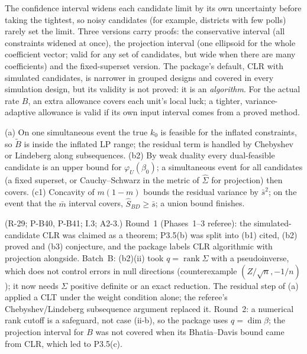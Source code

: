 \begin{plain}
The confidence interval widens each candidate limit by its own uncertainty before
taking the tightest, so noisy candidates (for example, districts with few polls)
rarely set the limit. Three versions carry proofs: the conservative interval (all
constraints widened at once), the projection interval (one ellipsoid for the
whole coefficient vector; valid for any set of candidates, but wide when there
are many coefficients) and the fixed-superset version. The package's default,
CLR with simulated candidates, is narrower in grouped designs and covered in every
simulation design, but its validity is not proved: it is an \emph{algorithm}.
For the actual rate $B$, an extra allowance covers each unit's local luck; a
tighter, variance-adaptive allowance is valid if its own input interval comes
from a proved method.
\end{plain}
\begin{sketch}
(a) On one simultaneous event the true $k_0$ is feasible for the inflated
constraints, so $\tilde B$ is inside the inflated LP range; the residual term is
handled by Chebyshev or Lindeberg along subsequences. (b2) By weak duality every
dual-feasible candidate is an upper bound for $\varphi_U(\beta_0)$; a simultaneous
event for all candidates (a fixed superset, or Cauchy--Schwarz in the metric of
$\hat\Sigma$ for projection) then covers. (c1) Concavity of $m(1-m)$ bounds the
residual variance by $\bar s^2$; on the event that the $\bar m$ interval covers,
$\hat S_{BD}\ge\bar s$; a union bound finishes.
\end{sketch}
\begin{revnote}
(R-29; P-B40, P-B41; I.3; A2-3.) Round~1 (Phases~1--3 referee): the simulated-candidate
CLR was claimed as a theorem; P3.5(b) was split into (b1) cited, (b2) proved and
(b3) conjecture, and the package labels CLR algorithmic with projection alongside.
Batch~B: (b2)(ii) took $q=\operatorname{rank}\Sigma$ with a pseudoinverse, which
does not control errors in null directions (counterexample $(Z/\sqrt n,-1/n)$);
it now needs $\Sigma$ positive definite or an exact reduction. The residual step
of (a) applied a CLT under the weight condition alone; the referee's
Chebyshev/Lindeberg subsequence argument replaced it. Round~2: a numerical rank
cutoff is a safeguard, not case (ii-b), so the package uses $q=\dim\beta$; the
projection interval for $B$ was not covered when its Bhatia--Davis bound came from
CLR, which led to P3.5(c).
\end{revnote}

